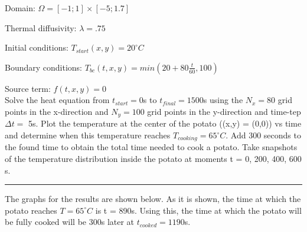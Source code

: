 \documentclass[12pt]{article}
\begin{document}
\hspace{4.2cm}Domain:\hspace{2.2cm} $\Omega = [-1;1] \times [-5;1.7]$

\hspace{2.15cm}Thermal diffusivity: \hspace{2cm} $\lambda = .75$

\hspace{2.55cm}Initial conditions: \hspace{2cm} $T_{start}(x,y) = 20^\circ C$

\hspace{1.74cm} Boundary conditions: \hspace{2cm} $T_{bc}(t,x,y) = min(20 + 80\frac{t}{60}, 100)$

\hspace{3.33cm} Source term: \hspace{2cm} $f(t,x,y) = 0$
\\

Solve the heat equation from $t_{start} = 0$s to $t_{final} = 1500$s using the $N_x = 80$ grid points in the x-direction and $N_y = 100$ grid points in the y-direction and time-tep $\Delta t =$ 5s. Plot the temperature at the center of the potato ((x,y) = (0,0)) vs time and determine when this temperature reaches $T_{cooking} = 65^\circ C$. Add 300 seconds to the found time to obtain the total time needed to cook a potato. Take snapshots of the temperature distribution inside the potato at moments t = 0, 200, 400, 600 s.
\begin{center}
\rule{10cm}{0.4pt}
\end{center}
The graphs for the results are shown below. As it is shown, the time at which the potato reaches $T = 65^\circ C$ is t = 890s. Using this, the time at which the potato will be fully cooked will be 300s later at $t_{cooked} = 1190$s.
\end{document}
